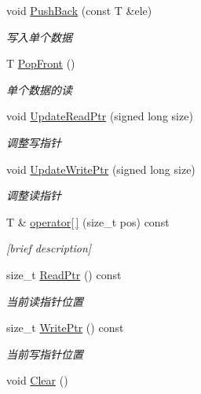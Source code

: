 \begin{DoxyCompactItemize}
void \hyperlink{classcyclicbuffer_1_1CyclicBuffer_a925d7b6c58e4880a0ede77a49f18e5f2}{\-Push\-Back} (const \-T \&ele)
\begin{DoxyCompactList}\small\item\em 写入单个数据 \end{DoxyCompactList}\item 
\-T \hyperlink{classcyclicbuffer_1_1CyclicBuffer_a7a3c36d77ab645e6ca2f143e8f26d0c3}{\-Pop\-Front} ()
\begin{DoxyCompactList}\small\item\em 单个数据的读 \end{DoxyCompactList}\item 
void \hyperlink{classcyclicbuffer_1_1CyclicBuffer_aaea4fe781dbf7705cfddabd7d3b66767}{\-Update\-Read\-Ptr} (signed long size)
\begin{DoxyCompactList}\small\item\em 调整写指针 \end{DoxyCompactList}\item 
void \hyperlink{classcyclicbuffer_1_1CyclicBuffer_a993c3932158b4371209119afb21585c8}{\-Update\-Write\-Ptr} (signed long size)
\begin{DoxyCompactList}\small\item\em 调整读指针 \end{DoxyCompactList}\item 
\-T \& \hyperlink{classcyclicbuffer_1_1CyclicBuffer_a11bd152dafd31057926f1c16de0ea5ec}{operator\mbox{[}$\,$\mbox{]}} (size\-\_\-t pos) const 
\begin{DoxyCompactList}\small\item\em \mbox{[}brief description\mbox{]} \end{DoxyCompactList}\item 
size\-\_\-t \hyperlink{classcyclicbuffer_1_1CyclicBuffer_afbb87d84cd7328dc491c26ea1ef6d643}{\-Read\-Ptr} () const 
\begin{DoxyCompactList}\small\item\em 当前读指针位置 \end{DoxyCompactList}\item 
size\-\_\-t \hyperlink{classcyclicbuffer_1_1CyclicBuffer_ac4e1aadac568e1458eba1e81f7c7980e}{\-Write\-Ptr} () const 
\begin{DoxyCompactList}\small\item\em 当前写指针位置 \end{DoxyCompactList}\item 
\hypertarget{classcyclicbuffer_1_1CyclicBuffer_a1dd62709d33861427c82054693a88717}{void \hyperlink{classcyclicbuffer_1_1CyclicBuffer_a1dd62709d33861427c82054693a88717}{\-Clear} ()}\label{classcyclicbuffer_1_1CyclicBuffer_a1dd62709d33861427c82054693a88717}


\end{DoxyCompactItemize}
